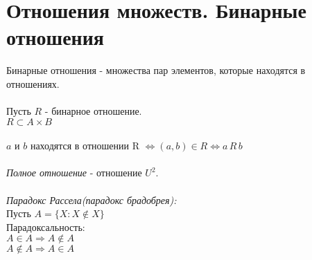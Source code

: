 \documentclass[12pt]{article}
\begin{document}
\section{Отношения множеств. Бинарные отношения}
Бинарные отношения - множества пар элементов, которые находятся в отношениях.\\\\
Пусть $R$ - бинарное отношение.\\
$R \subset A \times B$\\\\
$a$ и $b$ находятся в отношении R $\Leftrightarrow (a,b) \in R \Leftrightarrow a\,R\,b$ \\\\
\textit{Полное отношение} - отношение $U^2$.\\\\
\textit{Парадокс Рассела(парадокс брадобрея):\\}
Пусть $A = \{ X: X \notin X\}$\\
Парадоксальность:\\
$A \in A \Rightarrow A \notin A$\\
$A \notin A \Rightarrow A \in A$\\
\end{document}
